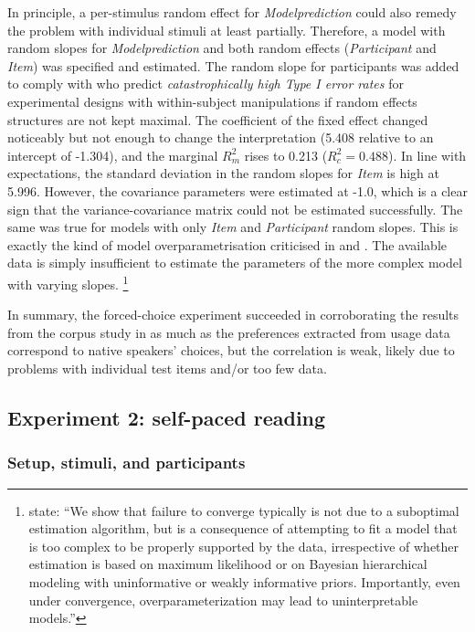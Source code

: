 In principle, a per-stimulus random effect for \textit{Modelprediction} could also remedy the problem with individual stimuli at least partially.
Therefore, a model with random slopes for \textit{Modelprediction} and both random effects (\textit{Participant} and \textit{Item}) was specified and estimated.
The random slope for participants was added to comply with \citet[257]{BarrEa2013} who predict \textit{catastrophically high Type I error rates} for experimental designs with within-subject manipulations if random effects structures are not kept maximal.
The coefficient of the fixed effect changed noticeably but not enough to change the interpretation (5.408 relative to an intercept of -1.304), and the marginal $R^2_m$ rises to 0.213 ($R^2_c=0.488$).
In line with expectations, the standard deviation in the random slopes for \textit{Item} is high at 5.996.
However, the covariance parameters were estimated at -1.0, which is a clear sign that the variance-covariance matrix could not be estimated successfully.
The same was true for models with only \textit{Item} and \textit{Participant} random slopes.
This is exactly the kind of model overparametrisation criticised in \citet{BatesEa2015a} and \citet{MatuschekEa2017}.
The available data is simply insufficient to estimate the parameters of the more complex model with varying slopes.%
\footnote{\citet[1]{BatesEa2015a} state: ``We show that failure to converge typically is not due to a suboptimal estimation algorithm, but is a consequence of attempting to fit a model that is too complex to be properly supported by the data, irrespective of whether estimation is based on maximum likelihood or on Bayesian hierarchical modeling with uninformative or weakly informative priors.
Importantly, even under convergence, overparameterization may lead to uninterpretable models.''
}

In summary, the forced-choice experiment succeeded in corroborating the results from the corpus study in as much as the preferences extracted from usage data correspond to native speakers' choices, but the correlation is weak, likely due to problems with individual test items and\slash or too few data.


\subsection{Experiment 2: self-paced reading}
\label{sec:exp:spr}

\subsubsection{Setup, stimuli, and participants}

